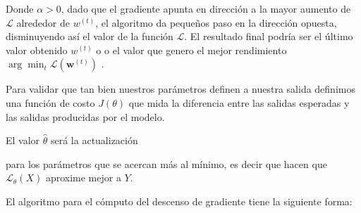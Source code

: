 Donde $ \alpha > 0$, dado que el gradiente apunta en  dirección a la mayor aumento de $\mathcal{L}$ alrededor de $w^{(t)}$, el algoritmo da pequeños paso en la dirección opuesta, disminuyendo así el valor de la función $\mathcal{L}$. El resultado final podría ser el último valor obtenido $w^{(t)}$ o o el valor que genero el mejor rendimiento $\arg\min_{t}\mathcal{L}(\textbf{w}^{(t)})$ \citep{gradient_des}.



Para validar que tan bien nuestros parámetros definen a nuestra salida definimos una función de costo $J(\theta)$ que mida la diferencia entre las salidas esperadas y las salidas producidas por el modelo. 


El valor $\hat\theta$ será la actualización 

para los parámetros que se acercan más al mínimo, es decir que hacen que $\mathcal{L}_\theta(X)$ aproxime mejor a $Y$. 


El algoritmo para el cómputo del descenso de gradiente tiene la siguiente forma:



	
